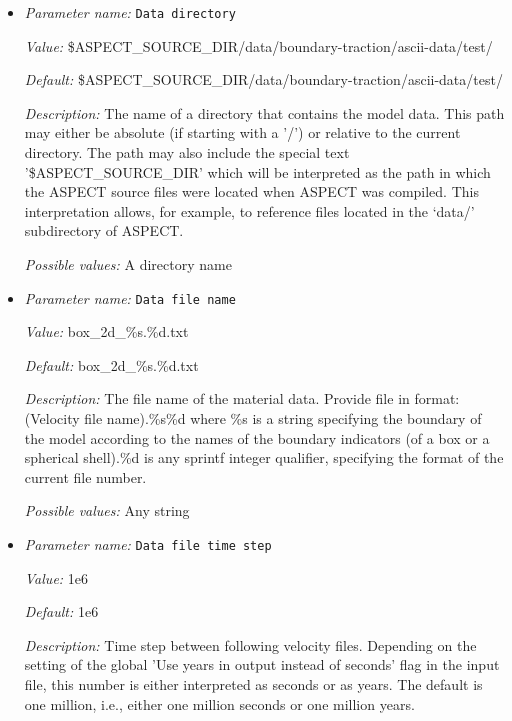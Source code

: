\begin{itemize}
\item {\it Parameter name:} {\tt Data directory}
\label{parameters:Boundary traction model/Ascii data model/Data directory}


{\it Value:} \$ASPECT\_SOURCE\_DIR/data/boundary-traction/ascii-data/test/


{\it Default:} \$ASPECT\_SOURCE\_DIR/data/boundary-traction/ascii-data/test/


{\it Description:} The name of a directory that contains the model data. This path may either be absolute (if starting with a '/') or relative to the current directory. The path may also include the special text '\$ASPECT\_SOURCE\_DIR' which will be interpreted as the path in which the ASPECT source files were located when ASPECT was compiled. This interpretation allows, for example, to reference files located in the `data/' subdirectory of ASPECT. 


{\it Possible values:} A directory name
\item {\it Parameter name:} {\tt Data file name}
\label{parameters:Boundary traction model/Ascii data model/Data file name}


{\it Value:} box\_2d\_\%s.\%d.txt


{\it Default:} box\_2d\_\%s.\%d.txt


{\it Description:} The file name of the material data. Provide file in format: (Velocity file name).\%s\%d where \%s is a string specifying the boundary of the model according to the names of the boundary indicators (of a box or a spherical shell).\%d is any sprintf integer qualifier, specifying the format of the current file number. 


{\it Possible values:} Any string
\item {\it Parameter name:} {\tt Data file time step}
\label{parameters:Boundary traction model/Ascii data model/Data file time step}


{\it Value:} 1e6


{\it Default:} 1e6


{\it Description:} Time step between following velocity files. Depending on the setting of the global 'Use years in output instead of seconds' flag in the input file, this number is either interpreted as seconds or as years. The default is one million, i.e., either one million seconds or one million years.



\end{itemize}
